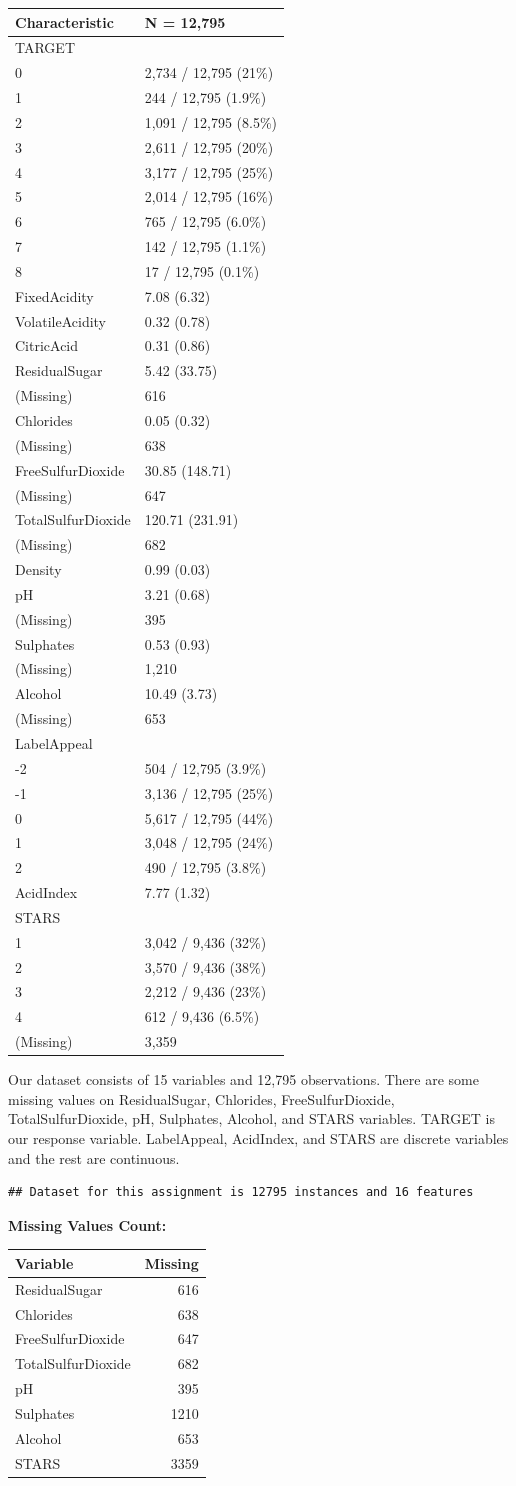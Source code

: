 \documentclass[]{elsarticle} %
\begin{document}
\begin{longtable}[]{@{}ll@{}}
\toprule
\textbf{Characteristic} & \textbf{N = 12,795}\tabularnewline
\midrule
\endhead
TARGET &\tabularnewline
0 & 2,734 / 12,795 (21\%)\tabularnewline
1 & 244 / 12,795 (1.9\%)\tabularnewline
2 & 1,091 / 12,795 (8.5\%)\tabularnewline
3 & 2,611 / 12,795 (20\%)\tabularnewline
4 & 3,177 / 12,795 (25\%)\tabularnewline
5 & 2,014 / 12,795 (16\%)\tabularnewline
6 & 765 / 12,795 (6.0\%)\tabularnewline
7 & 142 / 12,795 (1.1\%)\tabularnewline
8 & 17 / 12,795 (0.1\%)\tabularnewline
FixedAcidity & 7.08 (6.32)\tabularnewline
VolatileAcidity & 0.32 (0.78)\tabularnewline
CitricAcid & 0.31 (0.86)\tabularnewline
ResidualSugar & 5.42 (33.75)\tabularnewline
(Missing) & 616\tabularnewline
Chlorides & 0.05 (0.32)\tabularnewline
(Missing) & 638\tabularnewline
FreeSulfurDioxide & 30.85 (148.71)\tabularnewline
(Missing) & 647\tabularnewline
TotalSulfurDioxide & 120.71 (231.91)\tabularnewline
(Missing) & 682\tabularnewline
Density & 0.99 (0.03)\tabularnewline
pH & 3.21 (0.68)\tabularnewline
(Missing) & 395\tabularnewline
Sulphates & 0.53 (0.93)\tabularnewline
(Missing) & 1,210\tabularnewline
Alcohol & 10.49 (3.73)\tabularnewline
(Missing) & 653\tabularnewline
LabelAppeal &\tabularnewline
-2 & 504 / 12,795 (3.9\%)\tabularnewline
-1 & 3,136 / 12,795 (25\%)\tabularnewline
0 & 5,617 / 12,795 (44\%)\tabularnewline
1 & 3,048 / 12,795 (24\%)\tabularnewline
2 & 490 / 12,795 (3.8\%)\tabularnewline
AcidIndex & 7.77 (1.32)\tabularnewline
STARS &\tabularnewline
1 & 3,042 / 9,436 (32\%)\tabularnewline
2 & 3,570 / 9,436 (38\%)\tabularnewline
3 & 2,212 / 9,436 (23\%)\tabularnewline
4 & 612 / 9,436 (6.5\%)\tabularnewline
(Missing) & 3,359\tabularnewline
\bottomrule
\end{longtable}

Our dataset consists of 15 variables and 12,795 observations. There are
some missing values on ResidualSugar, Chlorides, FreeSulfurDioxide,
TotalSulfurDioxide, pH, Sulphates, Alcohol, and STARS variables. TARGET
is our response variable. LabelAppeal, AcidIndex, and STARS are discrete
variables and the rest are continuous.

\begin{verbatim}
## Dataset for this assignment is 12795 instances and 16 features
\end{verbatim}

\textbf{Missing Values Count:}

\begin{longtable}[]{@{}lr@{}}
\toprule
Variable & Missing\tabularnewline
\midrule
\endhead
ResidualSugar & 616\tabularnewline
Chlorides & 638\tabularnewline
FreeSulfurDioxide & 647\tabularnewline
TotalSulfurDioxide & 682\tabularnewline
pH & 395\tabularnewline
Sulphates & 1210\tabularnewline
Alcohol & 653\tabularnewline
STARS & 3359\tabularnewline
\bottomrule
\end{longtable}
\end{document}
